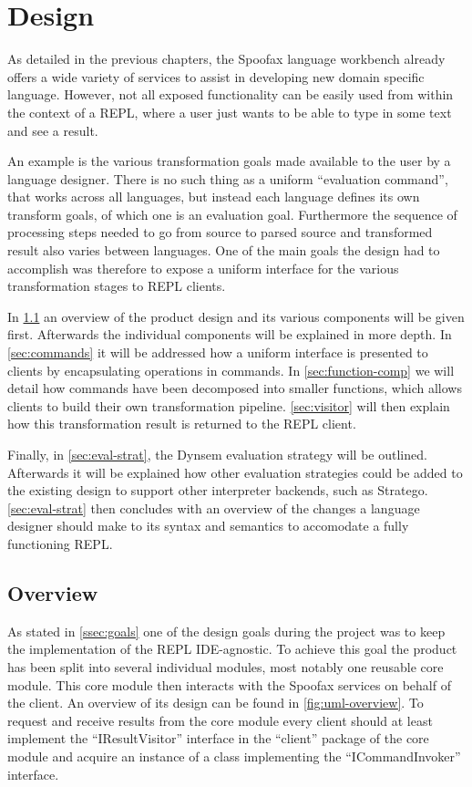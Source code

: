 \chapter{Design}
\label{cha:design}

As detailed in the previous chapters, the Spoofax language workbench already
offers a wide variety of services to assist in developing new domain specific
language. However, not all exposed functionality can be easily used from within
the context of a REPL, where a user just wants to be able to type in some text
and see a result.

An example is the various transformation goals made available to the user by a
language designer. There is no such thing as a uniform ``evaluation command'',
that works across all languages, but instead each language defines its own
transform goals, of which one is an evaluation goal.  Furthermore the sequence
of processing steps needed to go from source to parsed source and transformed
result also varies between languages. One of the main goals the design had to
accomplish was therefore to expose a uniform interface for the various
transformation stages to REPL clients.

In \cref{sec:overview} an overview of the product design and its various
components will be given first. Afterwards the individual components will be
explained in more depth. In \cref{sec:commands} it will be addressed how a
uniform interface is presented to clients by encapsulating operations in
commands. In \cref{sec:function-comp} we will detail how commands have been
decomposed into smaller functions, which allows clients to build their own
transformation pipeline. \cref{sec:visitor} will then explain how this
transformation result is returned to the REPL client.

Finally, in \cref{sec:eval-strat}, the Dynsem evaluation strategy will be
outlined.  Afterwards it will be explained how other evaluation strategies
could be added to the existing design to support other interpreter backends,
such as Stratego. \cref{sec:eval-strat} then concludes with an overview of the
changes a language designer should make to its syntax and semantics to
accomodate a fully functioning REPL.

\section{Overview}
\label{sec:overview}

As stated in \cref{ssec:goals} one of the design goals during the project was
to keep the implementation of the REPL IDE-agnostic. To achieve this goal the
product has been split into several individual modules, most notably one
reusable core module. This core module then interacts with the Spoofax services
on behalf of the client. An overview of its design can be found in
\cref{fig:uml-overview}. To request and receive results from the core module
every client should at least implement the ``IResultVisitor'' interface in the
``client'' package of the core module and acquire an instance of a class
implementing the ``ICommandInvoker'' interface.

